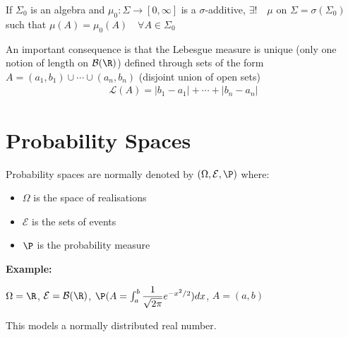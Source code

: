 \begin{defo}{}
  If $\Sigma_0$ is an algebra and $\mu_0:\Sigma\to[0,\infty]$ is a $\sigma$-additive, $\exists!\quad\mu$ on $\Sigma=\sigma(\Sigma_0)$ such that $\mu(A) = \mu_0(A)\quad\forall A\in\Sigma_0$
\end{defo}
\par\bigskip
\noindent An important consequence is that the Lebesgue measure is unique (only one notion of length on $\mathcal{B}(\R)$) defined through sets of the form $A = (a_1,b_1)\cup\cdots\cup(a_n,b_n)$ (disjoint union of open sets)
\begin{equation*}
  \begin{gathered}
    \mathcal{L}(A) = \left|b_1-a_1\right|+\cdots+\left|b_n-a_n\right|
  \end{gathered}
\end{equation*}
\par\bigskip
\section{Probability Spaces}
\noindent Probability spaces are normally denoted by $(\Omega,\mathcal{E}, \P)$ where:\par
\begin{itemize}
  \item $\Omega$ is the space of realisations
  \item $\mathcal{E}$ is the sets of events
  \item $\P$ is the probability measure
\end{itemize}
\par\bigskip
\noindent\textbf{Example:}\par
\noindent $\Omega = \R$, $\mathcal{E} = \mathcal{B}(\R)$, $\P(A = \int_{a}^{b}\dfrac{1}{\sqrt{2\pi}}e^{-x^2/2})dx$, $A = (a,b)$\par
\noindent This models a normally distributed real number.
\par\bigskip
